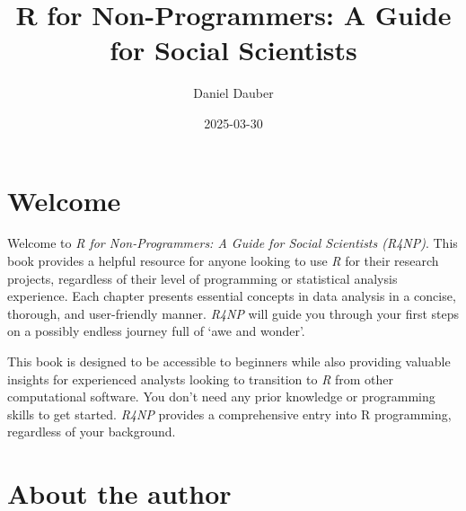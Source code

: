 \documentclass[
  letterpaper,
]{krantz}
\title{R for Non-Programmers: A Guide for Social Scientists}
\author{Daniel Dauber}
\date{2025-03-30}
\renewcommand*\contentsname{Table of contents}
\newcommand\contentsname{Table of contents}
\begin{document}
\maketitle


\thispagestyle{empty}

\begin{center}
\end{center}

\setlength{\abovedisplayskip}{-5pt}
\setlength{\abovedisplayshortskip}{-5pt}

\renewcommand*\contentsname{Table of contents}
{
\hypersetup{linkcolor=}
\setcounter{tocdepth}{2}
\tableofcontents
}

\chapter*{Welcome}\label{welcome}


Welcome to \emph{R for Non-Programmers: A Guide for Social Scientists
(R4NP)}. This book provides a helpful resource for anyone looking to use
\emph{R} for their research projects, regardless of their level of
programming or statistical analysis experience. Each chapter presents
essential concepts in data analysis in a concise, thorough, and
user-friendly manner. \emph{R4NP} will guide you through your first
steps on a possibly endless journey full of `awe and wonder'.

This book is designed to be accessible to beginners while also providing
valuable insights for experienced analysts looking to transition to
\emph{R} from other computational software. You don't need any prior
knowledge or programming skills to get started. \emph{R4NP} provides a
comprehensive entry into R programming, regardless of your background.

\mainmatter


\chapter*{About the author}\label{sec-about-the-author}
\end{document}
